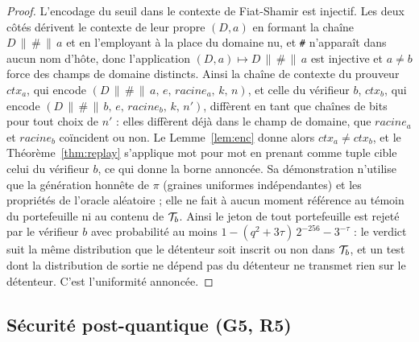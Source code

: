 \documentclass[11pt]{article}
\theoremstyle{definition}
\begin{document}
\begin{proof}
L'encodage du seuil dans le contexte de Fiat-Shamir est injectif. Les deux côtés dérivent
le contexte de leur propre $(D, a)$ en formant la chaîne $D \,\|\, \texttt{\#} \,\|\, a$
et en l'employant à la place du domaine nu, et \texttt{\#} n'apparaît dans aucun nom
d'hôte, donc l'application $(D, a) \mapsto D \,\|\, \texttt{\#} \,\|\, a$ est injective et
$a \ne b$ force des champs de domaine distincts. Ainsi la chaîne de contexte du prouveur
$\mathit{ctx}_a$, qui encode $(D \,\|\, \texttt{\#} \,\|\, a,\, e,\, \mathit{racine}_a,\,
k,\, n)$, et celle du vérifieur $b$, $\mathit{ctx}_b$, qui encode $(D \,\|\, \texttt{\#}
\,\|\, b,\, e,\, \mathit{racine}_b,\, k,\, n')$, diffèrent en tant que chaînes de bits
pour tout choix de $n'$ : elles diffèrent déjà dans le champ de domaine, que
$\mathit{racine}_a$ et $\mathit{racine}_b$ coïncident ou non. Le Lemme~\ref{lem:enc} donne alors $\mathit{ctx}_a \ne \mathit{ctx}_b$, et le
Théorème~\ref{thm:replay} s'applique mot pour mot en prenant comme tuple cible celui du
vérifieur $b$, ce qui donne la borne annoncée. Sa démonstration n'utilise que la
génération honnête de $\pi$ (graines uniformes indépendantes) et les propriétés de
l'oracle aléatoire ; elle ne fait à aucun moment référence au témoin du portefeuille ni au
contenu de $\mathcal{T}_b$. Ainsi le jeton de tout portefeuille est rejeté par le vérifieur $b$
avec probabilité au moins $1 - (q^2 + 3\tau)\,2^{-256} - 3^{-\tau}$ : le verdict suit la
même distribution que le détenteur soit inscrit ou non dans $\mathcal{T}_b$, et un test dont la
distribution de sortie ne dépend pas du détenteur ne transmet rien sur le détenteur. C'est
l'uniformité annoncée.
\end{proof}

\subsection{Sécurité post-quantique (G5, R5)}
\label{sec:pq}
\end{document}
